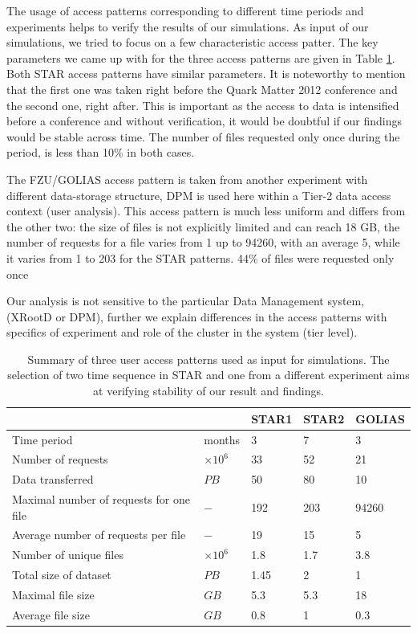 \documentclass[english]{ddny}
\begin{document}
The usage of access patterns corresponding to different time periods and experiments helps to verify the results of our simulations. As input of our simulations, we tried to focus on a few characteristic access patter. The key parameters we came up with for the three access patterns are given in Table \ref{patterns}. Both STAR access patterns have similar parameters. It is noteworthy to mention that the first one was taken right before the Quark Matter 2012 conference and the second one, right after. This is important as the access to data is intensified before a conference and without verification, it would be doubtful if our findings would be stable across time. The  number  of files requested  only once during  the period, is less than  10\% in both cases. 

The FZU/GOLIAS access pattern is taken from another experiment with different data-storage structure, DPM is used here within a Tier-2 data access context (user analysis). This access pattern is much less uniform and differs from the other  two:  the size of files is not explicitly limited and can reach 18 GB, the number of requests for a file varies from 1 up to 94260, with an average 5, while it varies from 1 to 203 for the STAR patterns. 44\% of files were requested  only once

Our analysis is not sensitive to the particular Data Management system, (XRootD or DPM), further we explain  differences in the access patterns with specifics of experiment and role of the cluster in the system (tier level).


\begin{centering}
\begin{table}
\caption{Summary of three user access patterns used as input for simulations. The selection of two time sequence in STAR and one from a different experiment aims at verifying stability of our result and findings.}
\centering
\begin{tabular}{lllll}
\hline
 &  &STAR1 & STAR2  & GOLIAS  \\ \hline
Time period& months & 3 & 7 & 3 \\ 
Number of requests&$ \times 10^{6} $& 33 & 52 & 21 \\ 
Data transferred& $ PB $ & 50 & 80 & 10 \\ 
Maximal number of requests for one file& $- $ &  192 & 203  & 94260 \\ 
Average number of requests per file& $- $ & 19 & 15 & 5 \\ 
Number of unique files& $\times 10^{6} $ & 1.8 & 1.7  & 3.8 \\ 
Total size of dataset& $PB $ & 1.45 & 2 & 1 \\
Maximal file size & $GB $ & 5.3 & 5.3 & 18 \\ 
Average file size & $ GB $& 0.8 & 1  & 0.3 \\ 	
\hline
\end{tabular}	
\label{patterns}
\end{table}
\end{centering}
\end{document}
